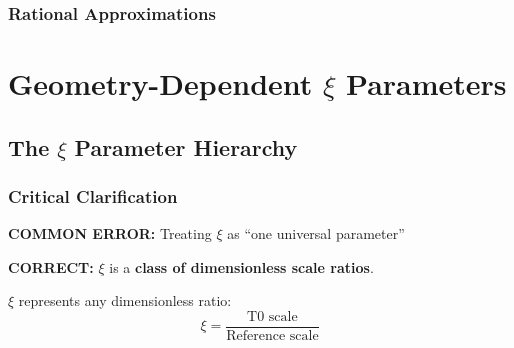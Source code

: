 	\subsubsection{Rational Approximations}
	\label{subsubsec:rational_approximations}
	
	\begin{table}[htbp]
		\centering
		\caption{Rational approximations to $\xi$ coefficient}
		\label{tab:rational_approximations}
	\end{table}
	
	\section{Geometry-Dependent \texorpdfstring{$\xi$}{xi} Parameters}
	\label{sec:geometry_dependent_xi}
	
	\subsection{The \texorpdfstring{$\xi$}{xi} Parameter Hierarchy}
	\label{subsec:xi_hierarchy}
	
	\subsubsection{Critical Clarification}
	\label{subsubsec:critical_clarification}
	
	\begin{tcolorbox}[colback=red!10!white,colframe=red!75!black,title=CRITICAL WARNING: $\xi$ Parameter Confusion,breakable]
		\textbf{COMMON ERROR:} Treating $\xi$ as ``one universal parameter''
		
		\textbf{CORRECT:} $\xi$ is a \textbf{class of dimensionless scale ratios}.
		
		$\xi$ represents any dimensionless ratio:
		\begin{equation}
			\xi = \frac{\text{T0 scale}}{\text{Reference scale}}
		\end{equation}
	\end{tcolorbox}
	

